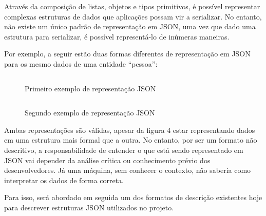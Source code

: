 \begin{table}[ht!]
  \centering
  \caption{Exemplo de tipos de valores em JSON}
\end{table}

Através da composição de listas, objetos e tipos primitivos, é possível representar complexas estruturas de dados que aplicações possam vir a serializar. No entanto, não existe um único padrão de representação em JSON, uma vez que dado uma estrutura para serializar, é possível representá-lo de inúmeras maneiras. \cite{Droettboom2015}

Por exemplo, a seguir estão duas formas diferentes de representação em JSON para os mesmo dados de uma entidade “pessoa”:

\begin{figure}[h]
  \centering
  \inputminted[frame=single,framesep=10pt]{javascript}{anexos/pessoa.json}
  \caption{Primeiro exemplo de representação JSON}
\end{figure}

\begin{figure}[h]
  \centering
  \inputminted[frame=single,framesep=10pt]{javascript}{anexos/pessoa-2.json}
  \caption{Segundo exemplo de representação JSON}
\end{figure}

Ambas representações são válidas, apesar da figura 4 estar representando dados em uma estrutura mais formal que a outra. No entanto, por ser um formato não descritivo, a responsabilidade de entender o que está sendo representado em JSON vai depender da análise crítica ou conhecimento prévio dos desenvolvedores. Já uma máquina, sem conhecer o contexto, não saberia como interpretar os dados de forma correta. \cite{Droettboom2015}

Para isso, será abordado em seguida um dos formatos de descrição existentes hoje para descrever estruturas JSON utilizados no projeto.


